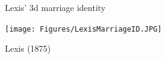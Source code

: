 \documentclass[20pt]{beamer}
\begin{document}
\begin{frame}[plain]
\end{frame}

\begin{frame}[plain]
\begin{center}
\Large
Lexis' 3d marriage identity
\vspace{2em}

\texttt{[image: Figures/LexisMarriageID.JPG]}
\end{center}
\vspace{1em}
\small
Lexis (1875)
\end{frame}
\end{document}
